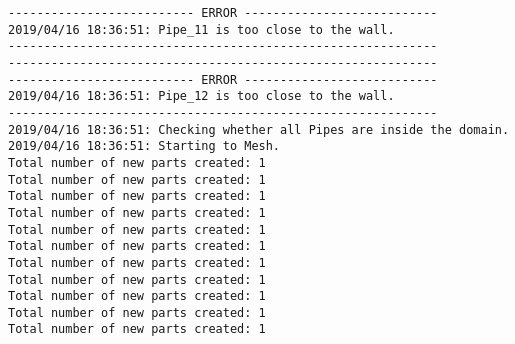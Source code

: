 \documentclass{article}
\begin{document}
{\begin{verbatim}
-------------------------- ERROR ---------------------------
2019/04/16 18:36:51: Pipe_11 is too close to the wall.
------------------------------------------------------------
------------------------------------------------------------
-------------------------- ERROR ---------------------------
2019/04/16 18:36:51: Pipe_12 is too close to the wall.
------------------------------------------------------------
2019/04/16 18:36:51: Checking whether all Pipes are inside the domain.
2019/04/16 18:36:51: Starting to Mesh.
Total number of new parts created: 1
Total number of new parts created: 1
Total number of new parts created: 1
Total number of new parts created: 1
Total number of new parts created: 1
Total number of new parts created: 1
Total number of new parts created: 1
Total number of new parts created: 1
Total number of new parts created: 1
Total number of new parts created: 1
Total number of new parts created: 1
\end{verbatim}
}
\clearpage
\end{document}
